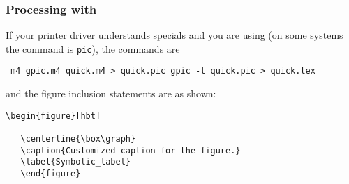 \subsubsection{Processing with \gpic\label{Processingwithgpic:}}
If your printer driver understands \tpic specials and
you are using \gpic  (on some systems the \gpic command is {\tt pic}),
the commands are

  {\tt
  m4 gpic.m4 quick.m4 > quick.pic
    \brtt
  gpic -t quick.pic > quick.tex
   \vspace*\parsep}

\noindent
and the figure inclusion statements are as shown:
\begin{verbatim}
\begin{figure}[hbt]
   
   \centerline{\box\graph}
   \caption{Customized caption for the figure.}
   \label{Symbolic_label}
   \end{figure}
\end{verbatim}

